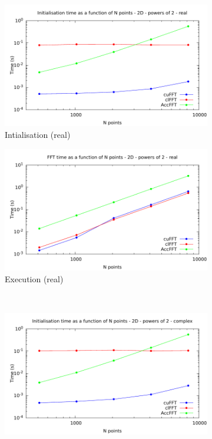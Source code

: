 \documentclass[12pt, a4paper]{article}
\begin{document}
\begin{figure}[H]
\captionsetup{width=0.8\linewidth}
\centering
\begin{subfigure}{.5\textwidth}
\centering
\includegraphics[width=.9\linewidth]{graphs/fft-2d-pow2-r-init.pdf}
\caption{Intialisation (real)}
\label{FFTPOW21DRI}
\end{subfigure}%
\begin{subfigure}{.5\textwidth}
\centering
\includegraphics[width=.9\linewidth]{graphs/fft-2d-pow2-r-exec.pdf}
\caption{Execution (real)}
\label{FFTPOW21DRE}
\end{subfigure}\\
\begin{subfigure}{.5\textwidth}
\centering
\includegraphics[width=.9\linewidth]{graphs/fft-2d-pow2-c-init.pdf}

\end{subfigure}
\end{figure}
\end{document}
